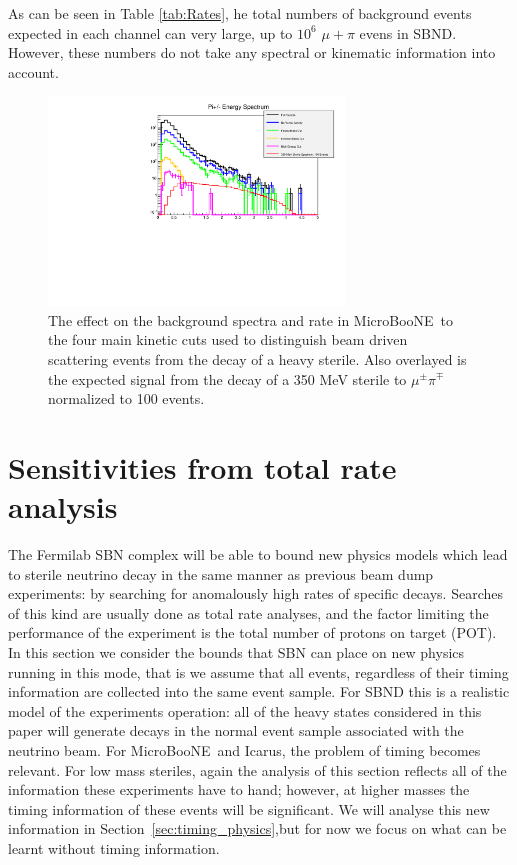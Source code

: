 \documentclass[11pt, a4paper]{article}
\newcommand{\refsec}[1]{Section~\ref{#1}}
\def\muboone{MicroBooNE}
\begin{document}
As can be seen in Table \ref{tab:Rates}, he total numbers of background events expected in each channel can very large, up to $10^6$ $\mu+\pi$ evens in SBND. However, these numbers do not take any spectral or kinematic information into account. 
\begin{figure}[t]
\center
\includegraphics[width=0.7\textwidth]{figures/cuts.pdf}
\caption{\label{fig:cuts} The effect on the background spectra and rate in \muboone\ to the four main kinetic cuts used to distinguish beam driven scattering events from the decay of a heavy sterile. Also overlayed is the expected signal from the decay of a 350 MeV sterile to $\mu^\pm \pi^\mp$ normalized to 100 events.}
\end{figure}





\section{Sensitivities from total rate analysis\label{sec:sensitivity}}

The Fermilab SBN complex will be able to bound new physics models which lead to
sterile neutrino decay in the same manner as previous beam dump experiments: by
searching for anomalously high rates of specific decays. Searches of this kind
are usually done as total rate analyses, and the factor limiting the
performance  of the experiment is the total number of protons on target (POT).
In this section we consider the bounds that SBN can place on new physics
running in this mode, that is we assume that all events, regardless of their
timing information are collected into the same event sample. For SBND this is a
realistic model of the experiments operation: all of the heavy states
considered in this paper will generate decays in the normal event sample
associated with the neutrino beam. For \muboone\ and Icarus, the problem of
timing becomes relevant.  For low mass steriles, again the analysis of this
section reflects all of the information these experiments have to hand;
however, at higher masses the timing information of these events will be
significant. We will analyse this new information in
\refsec{sec:timing_physics},but for now we focus on what can be learnt without
timing information.
\end{document}
